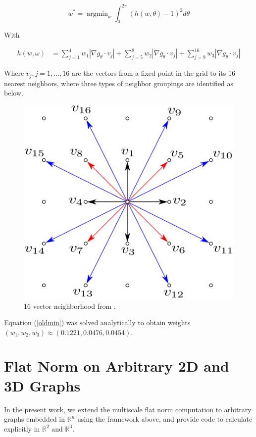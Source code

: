 \documentclass[12pt]{article}
\DeclareMathOperator*{\argmin}{argmin}
\begin{document}
\begin{equation} \label{oldmin}
w^* = \argmin_w \int_0^{2\pi} (h(w,\theta)-1)^2 d\theta
\end{equation}

With

\begin{align*}
h(w,\omega) &= \sum_{j=1}^4 w_1 |\nabla g_\theta \cdot v_j| + \sum_{j=5}^8 w_2 |\nabla g_\theta \cdot v_j| +  \sum_{j=9}^{16} w_3 |\nabla g_\theta \cdot v_j|
\end{align*}

Where $v_j, j= 1,...,16$ are the vectors from a fixed point in the grid to its 16 nearest neighbors, where three types of neighbor groupings are identified as below.

\begin{figure}[H]
\centering
\includegraphics[scale=0.25]{Figure_2_Vixie_Paper.png}
\caption{16 vector neighborhood from \cite{shapes}.}
\end{figure}

Equation (\ref{oldmin}) was solved analytically to obtain weights $(w_1,w_2,w_3) \approx (0.1221,0.0476,0.0454)$. 


\section{Flat Norm on Arbitrary 2D and 3D Graphs}

In the present work, we extend the multiscale flat norm computation to arbitrary graphs embedded in $\mathbb{R}^n$ using the framework above, and provide code to calculate explicitly in $\mathbb{R}^2$ and $\mathbb{R}^3$.
\end{document}

